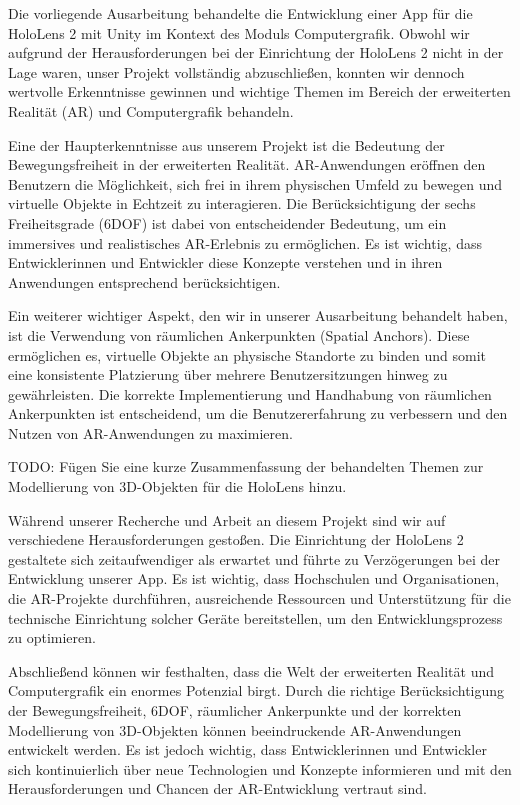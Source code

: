 Die vorliegende Ausarbeitung behandelte die Entwicklung einer App für die HoloLens 2 mit Unity im Kontext des Moduls Computergrafik.
Obwohl wir aufgrund der Herausforderungen bei der Einrichtung der HoloLens 2 nicht in der Lage waren, unser Projekt vollständig abzuschließen, konnten wir dennoch wertvolle Erkenntnisse gewinnen und wichtige Themen im Bereich der erweiterten Realität (AR) und Computergrafik behandeln.


Eine der Haupterkenntnisse aus unserem Projekt ist die Bedeutung der Bewegungsfreiheit in der erweiterten Realität.
AR-Anwendungen eröffnen den Benutzern die Möglichkeit, sich frei in ihrem physischen Umfeld zu bewegen und virtuelle Objekte in Echtzeit zu interagieren.
Die Berücksichtigung der sechs Freiheitsgrade (6DOF) ist dabei von entscheidender Bedeutung, um ein immersives und realistisches AR-Erlebnis zu ermöglichen.
Es ist wichtig, dass Entwicklerinnen und Entwickler diese Konzepte verstehen und in ihren Anwendungen entsprechend berücksichtigen.


Ein weiterer wichtiger Aspekt, den wir in unserer Ausarbeitung behandelt haben, ist die Verwendung von räumlichen Ankerpunkten (Spatial Anchors).
Diese ermöglichen es, virtuelle Objekte an physische Standorte zu binden und somit eine konsistente Platzierung über mehrere Benutzersitzungen hinweg zu gewährleisten.
Die korrekte Implementierung und Handhabung von räumlichen Ankerpunkten ist entscheidend, um die Benutzererfahrung zu verbessern und den Nutzen von AR-Anwendungen zu maximieren.


TODO: Fügen Sie eine kurze Zusammenfassung der behandelten Themen zur Modellierung von 3D-Objekten für die HoloLens hinzu.


Während unserer Recherche und Arbeit an diesem Projekt sind wir auf verschiedene Herausforderungen gestoßen.
Die Einrichtung der HoloLens 2 gestaltete sich zeitaufwendiger als erwartet und führte zu Verzögerungen bei der Entwicklung unserer App.
Es ist wichtig, dass Hochschulen und Organisationen, die AR-Projekte durchführen, ausreichende Ressourcen und Unterstützung für die technische Einrichtung solcher Geräte bereitstellen, um den Entwicklungsprozess zu optimieren.


Abschließend können wir festhalten, dass die Welt der erweiterten Realität und Computergrafik ein enormes Potenzial birgt.
Durch die richtige Berücksichtigung der Bewegungsfreiheit, 6DOF, räumlicher Ankerpunkte und der korrekten Modellierung von 3D-Objekten können beeindruckende AR-Anwendungen entwickelt werden.
Es ist jedoch wichtig, dass Entwicklerinnen und Entwickler sich kontinuierlich über neue Technologien und Konzepte informieren und mit den Herausforderungen und Chancen der AR-Entwicklung vertraut sind.


